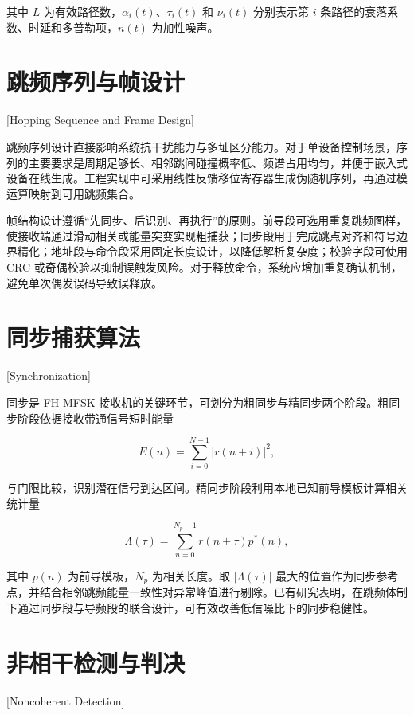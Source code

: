 其中 $L$ 为有效路径数，$\alpha_i(t)$、$\tau_i(t)$ 和 $\nu_i(t)$ 分别表示第 $i$ 条路径的衰落系数、时延和多普勒项，$n(t)$ 为加性噪声。

\section{跳频序列与帧设计}[Hopping Sequence and Frame Design]

跳频序列设计直接影响系统抗干扰能力与多址区分能力。对于单设备控制场景，序列的主要要求是周期足够长、相邻跳间碰撞概率低、频谱占用均匀，并便于嵌入式设备在线生成\cite{SongDongPoTiaoPinXuLieSheJiYanJiuXianZhuangYuWeiLaiFaZhan2024}。工程实现中可采用线性反馈移位寄存器生成伪随机序列，再通过模运算映射到可用跳频集合。

帧结构设计遵循“先同步、后识别、再执行”的原则。前导段可选用重复跳频图样，使接收端通过滑动相关或能量突变实现粗捕获；同步段用于完成跳点对齐和符号边界精化；地址段与命令段采用固定长度设计，以降低解析复杂度；校验字段可使用 CRC 或奇偶校验以抑制误触发风险。对于释放命令，系统应增加重复确认机制，避免单次偶发误码导致误释放。

\section{同步捕获算法}[Synchronization]

同步是 FH-MFSK 接收机的关键环节，可划分为粗同步与精同步两个阶段。粗同步阶段依据接收带通信号短时能量

\begin{equation}
  E(n)=\sum_{i=0}^{N-1} \left|r(n+i)\right|^2,
  \label{eq:energy_det}
\end{equation}

与门限比较，识别潜在信号到达区间。精同步阶段利用本地已知前导模板计算相关统计量

\begin{equation}
  \Lambda(\tau)=\sum_{n=0}^{N_p-1} r(n+\tau) p^{\ast}(n),
  \label{eq:correlation_sync}
\end{equation}

其中 $p(n)$ 为前导模板，$N_p$ 为相关长度。取 $|\Lambda(\tau)|$ 最大的位置作为同步参考点，并结合相邻跳频能量一致性对异常峰值进行剔除。已有研究表明，在跳频体制下通过同步段与导频段的联合设计，可有效改善低信噪比下的同步稳健性\cite{ZhaoXiangWuTiaoPinTongXinTongBuJiShuFaZhanZongShu2018,WangDingTiaoPinTongXinXiTongZhongTongBuJiShuDeYanJiuYuFangZhenFenXi2014}。

\section{非相干检测与判决}[Noncoherent Detection]

